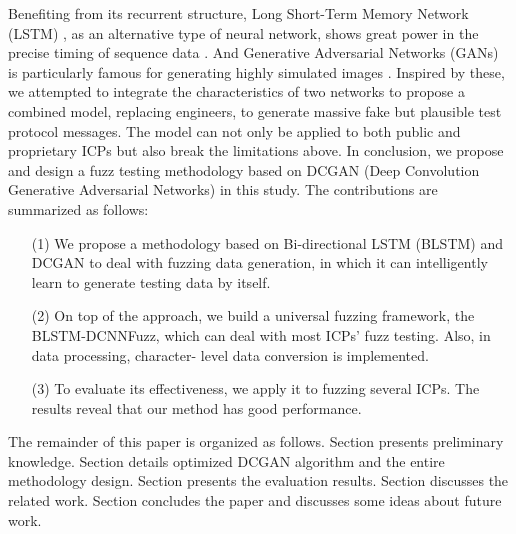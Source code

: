 Benefiting from its recurrent structure, Long Short-Term Memory Network (LSTM) \cite{hochreiter1997long}, as an alternative type of neural network, shows great power in the precise timing of sequence data \cite{gers2002learning}. And Generative Adversarial Networks (GANs) \cite{goodfellow2014generative} is particularly famous for generating highly simulated images \cite{karras2018style}. Inspired by these, we attempted to integrate the characteristics of two networks to propose a combined model, replacing engineers, to generate massive fake but plausible test protocol messages. The model can not only be applied to both public and proprietary ICPs but also break the limitations above. In conclusion, we propose and design a fuzz testing methodology based on DCGAN (Deep Convolution Generative Adversarial Networks) \cite{radford2015unsupervised} in this study. The contributions are summarized as follows:


\begin{itemize}
\item[(1)] We propose a methodology based on Bi-directional LSTM (BLSTM) and DCGAN to deal with fuzzing data generation, in which it can intelligently learn to generate testing data by itself.
\item[(2)] On top of the approach, we build a universal fuzzing framework, the BLSTM-DCNNFuzz, which can deal with most ICPs’ fuzz testing. Also, in data processing, character- level data conversion is implemented.
\item[(3)] To evaluate its effectiveness, we apply it to fuzzing several ICPs. The results reveal that our method has good performance.
\end{itemize}

The remainder of this paper is organized as follows. Section \uppercase\expandafter{} presents preliminary knowledge. Section \uppercase\expandafter{} details optimized DCGAN algorithm and the entire methodology design. Section \uppercase\expandafter{} presents the evaluation results. Section \uppercase\expandafter{} discusses the related work. Section \uppercase\expandafter{} concludes the paper and discusses some ideas about future work. 